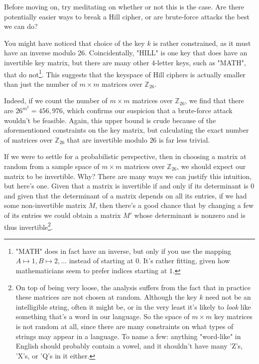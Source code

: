 \documentclass{paper}
\begin{document}
\medskip
Before moving on, try meditating on whether or not this is the case. Are there potentially easier ways to break a Hill cipher, or are brute-force attacks the best we can do? 

\medskip
You might have noticed that choice of the key $k$ is rather constrained, as it must have an inverse modulo 26. Coincidentally, "HILL" is one key that does have an invertible key matrix, but there are many other $4$-letter keys, such as "MATH", that do not\footnote{"MATH" does in fact have an inverse, but only if you use the mapping $A \mapsto 1, B \mapsto 2, \dots$ instead of starting at $0$. It's rather fitting, given how mathematicians seem to prefer indices starting at $1$.}. This suggests that the keyspace of Hill ciphers is actually smaller than just the number of $m \times m$ matrices over $\mathbb{Z}_{26}$.

\medskip
Indeed, if we count the number of $m \times m$ matrices over $\mathbb{Z}_{26}$, we find that there are $26^{m^2} = 456,976$, which confirms our suspicion that a brute-force attack wouldn't be feasible. Again, this upper bound is crude because of the aforementioned constraints on the key matrix, but calculating the exact number of matrices over $\mathbb{Z}_{26}$ that are invertible modulo $26$ is far less trivial. 

\medskip
If we were to settle for a probabilistic perspective, then in choosing a matrix at random from a sample space of $m \times m$ matrices over $\mathbb{Z}_{26}$, we should expect our matrix to be invertible. Why? There are many ways we can justify this intuition, but here's one. Given that a matrix is invertible if and only if its determinant is $0$ and given that the determinant of a matrix depends on all its entries, if we had some non-invertible matrix $M$, then there's a good chance that by changing a few of its entries we could obtain a matrix $M'$ whose determinant is nonzero and is thus invertible\footnote{On top of being very loose, the analysis suffers from the fact that in practice these matrices are not chosen at random. Although the key $k$ need not be an intelligible string, often it might be, or in the very least it's likely to \textit{look} like something that's a word in our language. So the space of $m \times m$ key matrices is not random at all, since there are many constraints on what types of strings may appear in a language. To name a few: anything "word-like" in English should probably contain a vowel, and it shouldn't have many 'Z's, 'X's, or 'Q's in it either. }.
\end{document}
